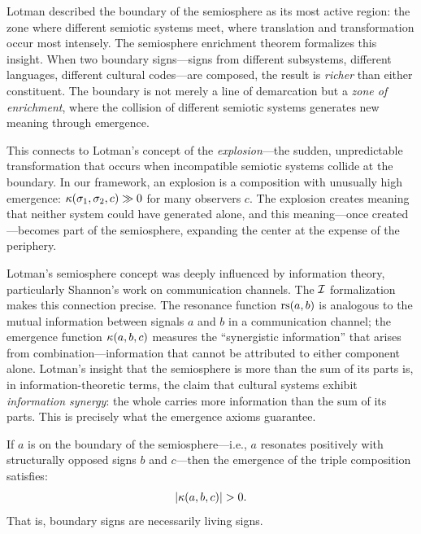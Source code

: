 \begin{interpretation}
\label{interp:lotman-boundary}
Lotman described the boundary of the semiosphere as its most active region: the zone where different semiotic systems meet, where translation and transformation occur most intensely. The semiosphere enrichment theorem formalizes this insight. When two boundary signs---signs from different subsystems, different languages, different cultural codes---are composed, the result is \emph{richer} than either constituent. The boundary is not merely a line of demarcation but a \emph{zone of enrichment}, where the collision of different semiotic systems generates new meaning through emergence.

This connects to Lotman's concept of the \emph{explosion}---the sudden, unpredictable transformation that occurs when incompatible semiotic systems collide at the boundary. In our framework, an explosion is a composition with unusually high emergence: $\kappa(\sigma_1, \sigma_2, c) \gg 0$ for many observers $c$. The explosion creates meaning that neither system could have generated alone, and this meaning---once created---becomes part of the semiosphere, expanding the center at the expense of the periphery.
\end{interpretation}

\begin{remark}
Lotman's semiosphere concept was deeply influenced by information theory, particularly Shannon's work on communication channels. The $\mathcal{I}$ formalization makes this connection precise. The resonance function $\mathrm{rs}(a, b)$ is analogous to the mutual information between signals $a$ and $b$ in a communication channel; the emergence function $\kappa(a, b, c)$ measures the ``synergistic information'' that arises from combination---information that cannot be attributed to either component alone. Lotman's insight that the semiosphere is more than the sum of its parts is, in information-theoretic terms, the claim that cultural systems exhibit \emph{information synergy}: the whole carries more information than the sum of its parts. This is precisely what the emergence axioms guarantee.
\end{remark}

\begin{theorem}
\label{thm:boundary-maximal-emergence}
If $a$ is on the boundary of the semiosphere---i.e., $a$ resonates positively with structurally opposed signs $b$ and $c$---then the emergence of the triple composition satisfies:
\[
  |\kappa(a, b, c)| > 0.
\]
That is, boundary signs are necessarily living signs.
\end{theorem}

